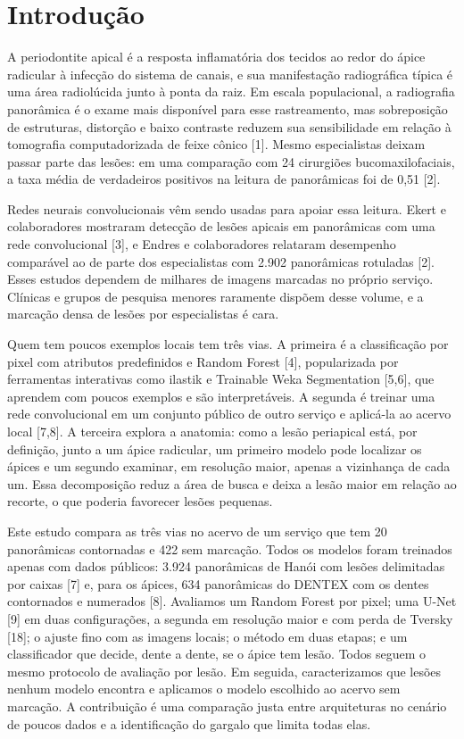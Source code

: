 \documentclass[twocolumn]{article}
\begin{document}
\section{Introdução}

A periodontite apical é a resposta inflamatória dos tecidos ao redor do ápice radicular à infecção do sistema de canais, e sua manifestação radiográfica típica é uma área radiolúcida junto à ponta da raiz. Em escala populacional, a radiografia panorâmica é o exame mais disponível para esse rastreamento, mas sobreposição de estruturas, distorção e baixo contraste reduzem sua sensibilidade em relação à tomografia computadorizada de feixe cônico [1]. Mesmo especialistas deixam passar parte das lesões: em uma comparação com 24 cirurgiões bucomaxilofaciais, a taxa média de verdadeiros positivos na leitura de panorâmicas foi de 0,51 [2].

Redes neurais convolucionais vêm sendo usadas para apoiar essa leitura. Ekert e colaboradores mostraram detecção de lesões apicais em panorâmicas com uma rede convolucional [3], e Endres e colaboradores relataram desempenho comparável ao de parte dos especialistas com 2.902 panorâmicas rotuladas [2]. Esses estudos dependem de milhares de imagens marcadas no próprio serviço. Clínicas e grupos de pesquisa menores raramente dispõem desse volume, e a marcação densa de lesões por especialistas é cara.

Quem tem poucos exemplos locais tem três vias. A primeira é a classificação por pixel com atributos predefinidos e Random Forest [4], popularizada por ferramentas interativas como ilastik e Trainable Weka Segmentation [5,6], que aprendem com poucos exemplos e são interpretáveis. A segunda é treinar uma rede convolucional em um conjunto público de outro serviço e aplicá-la ao acervo local [7,8]. A terceira explora a anatomia: como a lesão periapical está, por definição, junto a um ápice radicular, um primeiro modelo pode localizar os ápices e um segundo examinar, em resolução maior, apenas a vizinhança de cada um. Essa decomposição reduz a área de busca e deixa a lesão maior em relação ao recorte, o que poderia favorecer lesões pequenas.

Este estudo compara as três vias no acervo de um serviço que tem 20 panorâmicas contornadas e 422 sem marcação. Todos os modelos foram treinados apenas com dados públicos: 3.924 panorâmicas de Hanói com lesões delimitadas por caixas [7] e, para os ápices, 634 panorâmicas do DENTEX com os dentes contornados e numerados [8]. Avaliamos um Random Forest por pixel; uma U-Net [9] em duas configurações, a segunda em resolução maior e com perda de Tversky [18]; o ajuste fino com as imagens locais; o método em duas etapas; e um classificador que decide, dente a dente, se o ápice tem lesão. Todos seguem o mesmo protocolo de avaliação por lesão. Em seguida, caracterizamos que lesões nenhum modelo encontra e aplicamos o modelo escolhido ao acervo sem marcação. A contribuição é uma comparação justa entre arquiteturas no cenário de poucos dados e a identificação do gargalo que limita todas elas.
\end{document}
